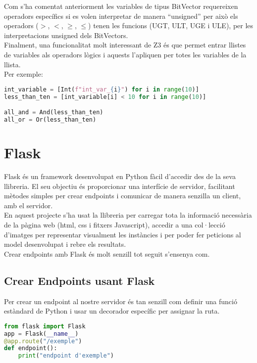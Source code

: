 Com s'ha comentat anteriorment les variables de tipus BitVector requereixen operadors específics si es volen interpretar de manera ``unsigned'' per això els operadors ($>$, $<$, $\geq$, $\leq$) tenen les funcions (UGT, ULT, UGE i ULE), per les interpretacions unsigned dels BitVectors.\\

Finalment, una funcionalitat molt interessant de Z3 és que permet entrar llistes de variables als operadors lògics i aquests l'apliquen per totes les variables de la llista.\\
Per exemple:

\begin{lstlisting}[language=Python, caption=Variable Declaration]
int_variable = [Int(f"int_var_{i}") for i in range(10)]
less_than_ten = [int_variable[i] < 10 for i in range(10)]

all_and = And(less_than_ten)
all_or = Or(less_than_ten)
\end{lstlisting}

\section{Flask}
Flask és un framework desenvolupat en Python fàcil d'accedir des de la seva llibreria. El seu objectiu és proporcionar una interfície de servidor, facilitant mètodes simples per crear endpoints i comunicar de manera senzilla un client, amb el servidor.\\
En aquest projecte s'ha usat la llibreria per carregar tota la informació necessària de la pàgina web (html, css i fitxers Javascript), accedir a una col·lecció d'imatges per representar visualment les instàncies i per poder fer peticions al model desenvolupat i rebre els resultats.\\
Crear endpoints amb Flask és molt senzill tot seguit s'ensenya com.

\subsection{Crear Endpoints usant Flask}
Per crear un endpoint al nostre servidor és tan senzill com definir una funció estàndard de Python i usar un decorador específic per assignar la ruta.
\begin{lstlisting}[language=Python, caption=Declaració d'un endpoint]
from flask import Flask
app = Flask(__name__)
@app.route("/exemple")
def endpoint():
    print("endpoint d'exemple")
\end{lstlisting}

